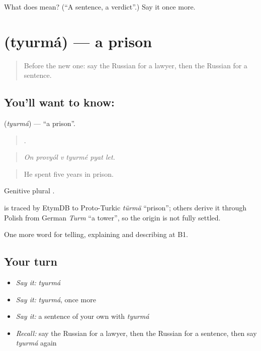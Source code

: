 \begin{tcolorbox}[breakable,colback=teal!4,colframe=teal!35!black,title={Before you move on}]
What does  mean? (\textquotedblleft{}A sentence, a verdict\textquotedblright{}.) Say it once more.
\end{tcolorbox}
\section[\texorpdfstring{\ru{тюрьма} (tyurmá)}{тюрьма (tyurmá)}]{ (tyurmá) — a prison}

\label{lesson:RU-C293-tyurma}



\begin{quote}
Before the new one: say the Russian for a lawyer, then the Russian for a sentence.
\end{quote}

\subsection*{You'll want to know: }
\textbf{} (\emph{tyurmá}) — \textquotedblleft{}a prison\textquotedblright{}.

\begin{quote}
     .
\end{quote}

\begin{quote}
\emph{On provyól v tyurmé pyat let.}
\end{quote}

\begin{quote}
He spent five years in prison.
\end{quote}

Genitive plural \emph{}.

\begin{cousinweb}
\emph{} is traced by EtymDB to Proto-Turkic \emph{türmä} \textquotedblleft{}prison\textquotedblright{}; others derive it through Polish from German \emph{Turm} \textquotedblleft{}a tower\textquotedblright{}, so the origin is not fully settled.
\end{cousinweb}

\begin{grammarlens}[title={What you've built}]
One more word for telling, explaining and describing at B1.
\end{grammarlens}

\subsection*{Your turn}
\begin{itemize}
\raggedright
  \item \emph{Say it:} \emph{tyurmá}
  \item \emph{Say it:} \emph{tyurmá}, once more
  \item \emph{Say it:} a sentence of your own with \emph{tyurmá}
  \item \emph{Recall:} say the Russian for a lawyer, then the Russian for a sentence, then say \emph{tyurmá} again
\end{itemize}

